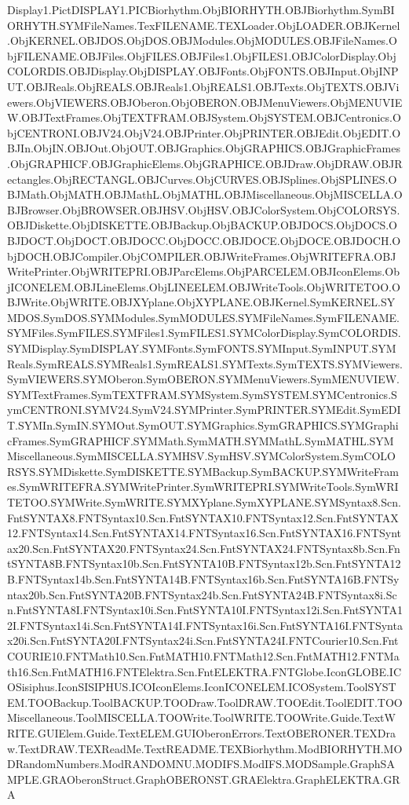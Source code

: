 Display1.Pict DISPLAY1.PIC Biorhythm.Obj BIORHYTH.OBJ Biorhythm.Sym BIORHYTH.SYM FileNames.Tex FILENAME.TEX Loader.Obj LOADER.OBJ Kernel.Obj KERNEL.OBJ DOS.Obj DOS.OBJ Modules.Obj MODULES.OBJ FileNames.Obj FILENAME.OBJ Files.Obj FILES.OBJ Files1.Obj FILES1.OBJ ColorDisplay.Obj COLORDIS.OBJ Display.Obj DISPLAY.OBJ Fonts.Obj FONTS.OBJ Input.Obj INPUT.OBJ Reals.Obj REALS.OBJ Reals1.Obj REALS1.OBJ Texts.Obj TEXTS.OBJ Viewers.Obj VIEWERS.OBJ Oberon.Obj OBERON.OBJ MenuViewers.Obj MENUVIEW.OBJ TextFrames.Obj TEXTFRAM.OBJ System.Obj SYSTEM.OBJ Centronics.Obj CENTRONI.OBJ V24.Obj V24.OBJ Printer.Obj PRINTER.OBJ Edit.Obj EDIT.OBJ In.Obj IN.OBJ Out.Obj OUT.OBJ Graphics.Obj GRAPHICS.OBJ GraphicFrames.Obj GRAPHICF.OBJ GraphicElems.Obj GRAPHICE.OBJ Draw.Obj DRAW.OBJ Rectangles.Obj RECTANGL.OBJ Curves.Obj CURVES.OBJ Splines.Obj SPLINES.OBJ Math.Obj MATH.OBJ MathL.Obj MATHL.OBJ Miscellaneous.Obj MISCELLA.OBJ Browser.Obj BROWSER.OBJ HSV.Obj HSV.OBJ ColorSystem.Obj COLORSYS.OBJ Diskette.Obj DISKETTE.OBJ Backup.Obj BACKUP.OBJ DOCS.Obj DOCS.OBJ DOCT.Obj DOCT.OBJ DOCC.Obj DOCC.OBJ DOCE.Obj DOCE.OBJ DOCH.Obj DOCH.OBJ Compiler.Obj COMPILER.OBJ WriteFrames.Obj WRITEFRA.OBJ WritePrinter.Obj WRITEPRI.OBJ ParcElems.Obj PARCELEM.OBJ IconElems.Obj ICONELEM.OBJ LineElems.Obj LINEELEM.OBJ WriteTools.Obj WRITETOO.OBJ Write.Obj WRITE.OBJ XYplane.Obj XYPLANE.OBJ Kernel.Sym KERNEL.SYM DOS.Sym DOS.SYM Modules.Sym MODULES.SYM FileNames.Sym FILENAME.SYM Files.Sym FILES.SYM Files1.Sym FILES1.SYM ColorDisplay.Sym COLORDIS.SYM Display.Sym DISPLAY.SYM Fonts.Sym FONTS.SYM Input.Sym INPUT.SYM Reals.Sym REALS.SYM Reals1.Sym REALS1.SYM Texts.Sym TEXTS.SYM Viewers.Sym VIEWERS.SYM Oberon.Sym OBERON.SYM MenuViewers.Sym MENUVIEW.SYM TextFrames.Sym TEXTFRAM.SYM System.Sym SYSTEM.SYM Centronics.Sym CENTRONI.SYM V24.Sym V24.SYM Printer.Sym PRINTER.SYM Edit.Sym EDIT.SYM In.Sym IN.SYM Out.Sym OUT.SYM Graphics.Sym GRAPHICS.SYM GraphicFrames.Sym GRAPHICF.SYM Math.Sym MATH.SYM MathL.Sym MATHL.SYM Miscellaneous.Sym MISCELLA.SYM HSV.Sym HSV.SYM ColorSystem.Sym COLORSYS.SYM Diskette.Sym DISKETTE.SYM Backup.Sym BACKUP.SYM WriteFrames.Sym WRITEFRA.SYM WritePrinter.Sym WRITEPRI.SYM WriteTools.Sym WRITETOO.SYM Write.Sym WRITE.SYM XYplane.Sym XYPLANE.SYM Syntax8.Scn.Fnt SYNTAX8.FNT Syntax10.Scn.Fnt SYNTAX10.FNT Syntax12.Scn.Fnt SYNTAX12.FNT Syntax14.Scn.Fnt SYNTAX14.FNT Syntax16.Scn.Fnt SYNTAX16.FNT Syntax20.Scn.Fnt SYNTAX20.FNT Syntax24.Scn.Fnt SYNTAX24.FNT Syntax8b.Scn.Fnt SYNTA8B.FNT Syntax10b.Scn.Fnt SYNTA10B.FNT Syntax12b.Scn.Fnt SYNTA12B.FNT Syntax14b.Scn.Fnt SYNTA14B.FNT Syntax16b.Scn.Fnt SYNTA16B.FNT Syntax20b.Scn.Fnt SYNTA20B.FNT Syntax24b.Scn.Fnt SYNTA24B.FNT Syntax8i.Scn.Fnt SYNTA8I.FNT Syntax10i.Scn.Fnt SYNTA10I.FNT Syntax12i.Scn.Fnt SYNTA12I.FNT Syntax14i.Scn.Fnt SYNTA14I.FNT Syntax16i.Scn.Fnt SYNTA16I.FNT Syntax20i.Scn.Fnt SYNTA20I.FNT Syntax24i.Scn.Fnt SYNTA24I.FNT Courier10.Scn.Fnt COURIE10.FNT Math10.Scn.Fnt MATH10.FNT Math12.Scn.Fnt MATH12.FNT Math16.Scn.Fnt MATH16.FNT Elektra.Scn.Fnt ELEKTRA.FNT Globe.Icon GLOBE.ICO Sisiphus.Icon SISIPHUS.ICO IconElems.Icon ICONELEM.ICO System.Tool SYSTEM.TOO Backup.Tool BACKUP.TOO Draw.Tool DRAW.TOO Edit.Tool EDIT.TOO Miscellaneous.Tool MISCELLA.TOO Write.Tool WRITE.TOO Write.Guide.Text WRITE.GUI Elem.Guide.Text ELEM.GUI OberonErrors.Text OBERONER.TEX Draw.Text DRAW.TEX ReadMe.Text README.TEX Biorhythm.Mod BIORHYTH.MOD RandomNumbers.Mod RANDOMNU.MOD IFS.Mod IFS.MOD Sample.Graph SAMPLE.GRA OberonStruct.Graph OBERONST.GRA Elektra.Graph ELEKTRA.GRA 